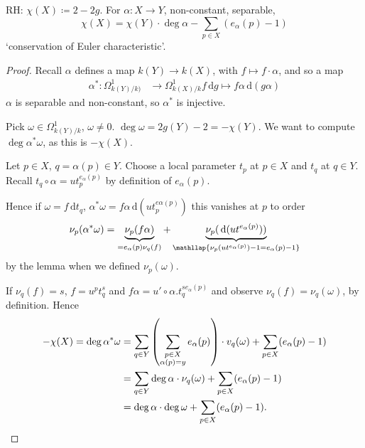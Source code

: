 \documentclass{article}
\newcommand{\diff}{\,\textrm{d}}
\begin{document}
RH: $\chi(X) \coloneqq 2 - 2g$. For $\alpha: X \to Y$, non-constant, separable,
\begin{equation*}
    \chi(X) = \chi(Y) \cdot \deg \alpha - \sum_{p \in X} (e_\alpha(p) - 1)
\end{equation*}
`conservation of Euler characteristic'.
\begin{proof}
    Recall $\alpha$ defines a map $k(Y) \to k(X)$, with $f \mapsto f \cdot \alpha$, and so a map
    \begin{align*}
        \alpha^*: \Omega^1_{k(Y)/k)} &\longrightarrow \Omega^1_{k(X)/k}
        f \diff g \longmapsto f \alpha \diff(g \alpha)
    \end{align*}
    $\alpha$ is separable and non-constant, so $\alpha^*$ is injective.

    Pick $\omega \in \Omega^1_{k(Y)/k}$, $\omega \neq 0$. $\deg \omega = 2 g(Y) - 2 = -\chi(Y)$.
    We want to compute $\deg \alpha^* \omega$, as this is $-\chi(X)$.

    Let $p \in X$, $q=\alpha(p) \in Y$. Choose a local parameter $t_p$ at $p \in X$ and $t_q$ at $q \in Y$.
    Recall $t_q \circ \alpha = u t_p^{e_\alpha(p)}$ by definition of $e_\alpha(p)$.

    Hence if $\omega = f \diff t_q$, $\alpha^* \omega = f \alpha \diff (u t_p^{e\alpha(p)})$ this vanishes at $p$ to order
    \begin{align*}
        \nu_p(\alpha^* \omega) = \underbrace{\nu_p(f\alpha)}_{= e_\alpha(p) \nu_q(f)} + \underbrace{\nu_p(\diff (ut^{e_\alpha(p)}))}_{\mathllap{\nu_p(u t^{e_\alpha(p)}) - 1 = e_\alpha(p) - 1}}
    \end{align*}
    by the lemma when we defined $\nu_p(\omega)$.

    If $\nu_q(f) = s$, $f = u^p t_q^s$ and $f \alpha = u' \circ \alpha . t_q^{s e_\alpha(p)}$ and observe $\nu_q(f) = \nu_q(\omega)$, by definition. Hence
    \begin{align*}
        -\chi(X) = \deg \alpha^* \omega &= \sum_{q \in Y} \left(\sum_{\substack{p \in X \\ \alpha(p) = y}} e_\alpha(p)\right) \cdot v_q(\omega) + \sum_{p \in X} (e_\alpha(p) - 1) \\
                                        &= \sum_{q \in Y} \deg \alpha \cdot \nu_q(\omega) + \sum_{p \in X} (e_\alpha(p) - 1) \\
                                        &= \deg \alpha \cdot \deg \omega + \sum_{p \in X} (e_\alpha(p) - 1). \qedhere
    \end{align*}
\end{proof}
\end{document}
